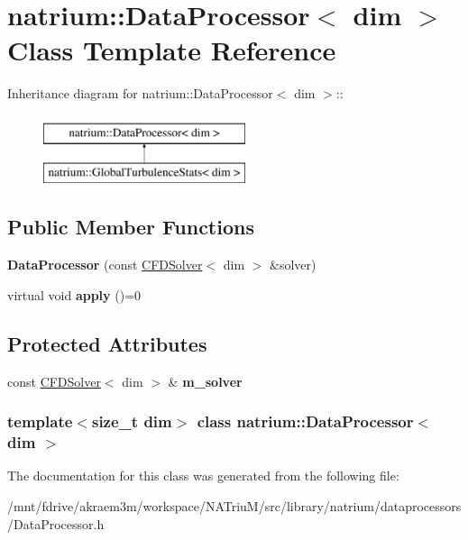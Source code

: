 \hypertarget{classnatrium_1_1DataProcessor}{
\section{natrium::DataProcessor$<$ dim $>$ Class Template Reference}
\label{classnatrium_1_1DataProcessor}
}
Inheritance diagram for natrium::DataProcessor$<$ dim $>$::\begin{figure}[H]
\begin{center}
\leavevmode
\includegraphics[height=2cm]{classnatrium_1_1DataProcessor}
\end{center}
\end{figure}
\subsection*{Public Member Functions}
\begin{DoxyCompactItemize}
\item 
\hypertarget{classnatrium_1_1DataProcessor_a2fad7980d6ddf5d54b435eec11bb67af}{
{\bfseries DataProcessor} (const \hyperlink{classnatrium_1_1CFDSolver}{CFDSolver}$<$ dim $>$ \&solver)}
\label{classnatrium_1_1DataProcessor_a2fad7980d6ddf5d54b435eec11bb67af}

\item 
\hypertarget{classnatrium_1_1DataProcessor_a82939cd7d981e39d2f4f2483b79e03dd}{
virtual void {\bfseries apply} ()=0}
\label{classnatrium_1_1DataProcessor_a82939cd7d981e39d2f4f2483b79e03dd}

\end{DoxyCompactItemize}
\subsection*{Protected Attributes}
\begin{DoxyCompactItemize}
\item 
\hypertarget{classnatrium_1_1DataProcessor_a93587d77d4b6f8735ca08be4e013fb45}{
const \hyperlink{classnatrium_1_1CFDSolver}{CFDSolver}$<$ dim $>$ \& {\bfseries m\_\-solver}}
\label{classnatrium_1_1DataProcessor_a93587d77d4b6f8735ca08be4e013fb45}

\end{DoxyCompactItemize}
\subsubsection*{template$<$size\_\-t dim$>$ class natrium::DataProcessor$<$ dim $>$}



The documentation for this class was generated from the following file:\begin{DoxyCompactItemize}
\item 
/mnt/fdrive/akraem3m/workspace/NATriuM/src/library/natrium/dataprocessors/DataProcessor.h\end{DoxyCompactItemize}
